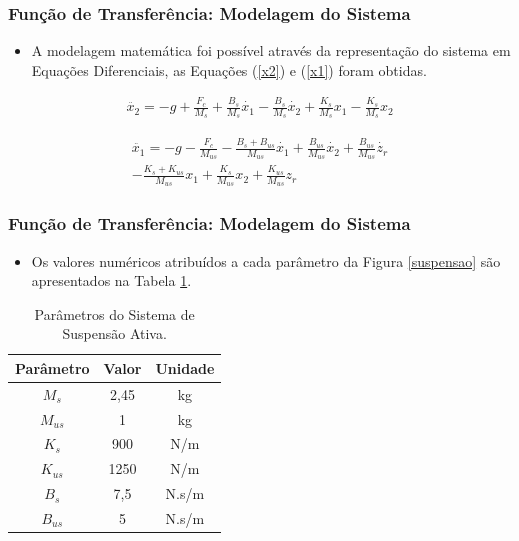 \documentclass{beamer}
\begin{document}
\begin{frame}
\frametitle{Função de Transferência: Modelagem do Sistema}
\begin{itemize}
\item A modelagem matemática foi possível através da representação do sistema em Equações Diferenciais, as Equações (\ref{x2}) e (\ref{x1}) foram obtidas.
\end{itemize}

\begin{equation}\label{x2}
\begin{matrix}
\ddot{x_2} = -g + \frac{F_c}{M_s} + \frac{B_s}{M_s}\dot{x_1} - \frac{B_s}{M_s}\dot{x_2} + \frac{K_s}{M_s}x_1 -\frac{K_s}{M_s}x_2
\end{matrix}
\end{equation}

\begin{equation}\label{x1}
\begin{matrix}
\ddot{x_1}= -g - \frac{F_c}{M_{us}} - \frac{B_s+B_{us}}{M_{us}}\dot{x_1} + \frac{B_{us}}{M_{us}}\dot{x_2} + \frac{B_{us}}{M_{us}}\dot{z_r}\\- \frac{K_s+K_{us}}{M_{us}}x_1 + \frac{K_s}{M_{us}}x_2 + \frac{K_{us}}{M_{us}}z_r
\end{matrix}
\end{equation}
\end{frame}

\begin{frame}
\frametitle{Função de Transferência: Modelagem do Sistema}
\begin{itemize}
\item Os valores numéricos atribuídos a cada parâmetro da Figura \ref{suspensao} são apresentados na Tabela \ref{parametros}.
\end{itemize}

\begin{table}[H]{\centering}
\centering
  \renewcommand{\tablename}{Tabela 1}
  \caption{Parâmetros do Sistema de Suspensão Ativa.}
  \begin{tabular}{|c|c|c|} \hline
   Parâmetro & Valor & Unidade \\ \hline
   $M_s$ & 2,45 & kg \\ \hline
   $M_{us}$ & 1 & kg \\ \hline
   $K_s$ & 900 & N/m \\ \hline
   $K_{us}$ & 1250 & N/m \\ \hline
   $B_s$ & 7,5 & N.s/m \\ \hline
   $B_{us}$ & 5 & N.s/m \\ \hline
   \end{tabular}
  \label{parametros}
\end{table}
\end{frame}
\end{document}
